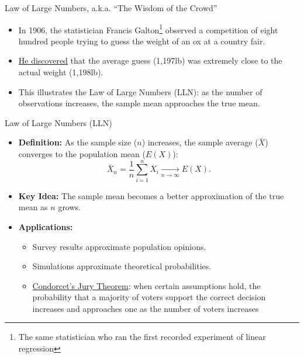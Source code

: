 \documentclass[aspectratio=169]{beamer}
\begin{document}
\begin{frame}{Law of Large Numbers, a.k.a. ``The Wisdom of the Crowd''}
    \begin{itemize}
        \item In 1906, the statistician Francis Galton\footnote{The same statistician who ran the first recorded experiment of linear regression} observed a competition of eight hundred people trying to guess the weight of an ox at a country fair. 
        
        \item \href{https://www.nature.com/articles/075450a0.pdf}{He discovered} that the average guess (1,197lb) was extremely close to the actual weight (1,198lb).
        
        \item This illustrates the Law of Large Numbers (LLN): as the number of observations increases, the sample mean approaches the true mean.
    \end{itemize}
\end{frame}

\begin{frame}{Law of Large Numbers (LLN)}
    \begin{itemize}
        \item \textbf{Definition:} As the sample size (\(n\)) increases, the sample average (\(\bar{X}\)) converges to the population mean (\(E(X)\)):
        \[
        \bar{X}_n = \frac{1}{n} \sum_{i=1}^n X_i \xrightarrow[n\rightarrow\infty]{}  E(X).
        \]
        \item \textbf{Key Idea:} The sample mean becomes a better approximation of the true mean as \(n\) grows.
        \item \textbf{Applications:}
        \begin{itemize}
            \item Survey results approximate population opinions.
            \item Simulations approximate theoretical probabilities.
            \item \href{https://en.wikipedia.org/wiki/Condorcet's_jury_theorem}{Condorcet’s Jury Theorem}: when certain assumptions hold, the probability that a majority of voters support the correct decision increases and approaches one as the number of voters increases
        \end{itemize}
    \end{itemize}
\end{frame}
\end{document}
